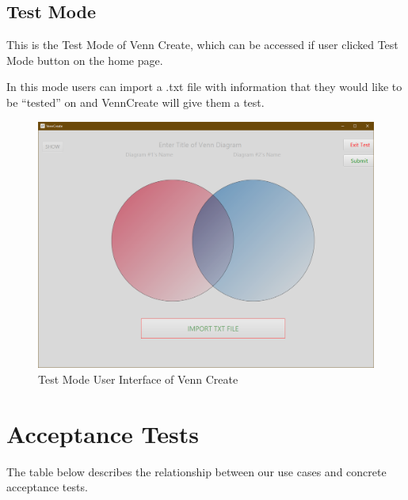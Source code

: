 \documentclass[fontsize=12pt,paper=letter,twoside]{scrartcl}
\begin{document}
\newpage

\subsection{Test Mode}

This is the Test Mode of Venn Create, which can be accessed if user clicked Test Mode button on the home page.

In this mode users can import a .txt file with information that they would like to be “tested” on and VennCreate will give them a test.

\begin{figure}[!hbt]
	\includegraphics[width=\textwidth]{images/user-interface-test-mode.png}
	\caption{Test Mode User Interface of Venn Create}
\end{figure}

\newpage
\section{Acceptance Tests}

The table below describes the relationship between our use cases and concrete acceptance tests.
\end{document}
